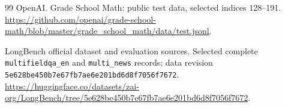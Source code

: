 \documentclass[10pt,a4paper]{article}
\begin{document}
\begin{thebibliography}{99}
OpenAI.
\newblock Grade School Math: public test data, selected indices 128--191.
\url{https://github.com/openai/grade-school-math/blob/master/grade_school_math/data/test.jsonl}.

LongBench official dataset and evaluation sources.
\newblock Selected complete \texttt{multifieldqa\_en} and \texttt{multi\_news}
records; data revision \texttt{5e628be450b7e67fb7ae6e201bd6d8f7056f7672}.
\url{https://huggingface.co/datasets/zai-org/LongBench/tree/5e628be450b7e67fb7ae6e201bd6d8f7056f7672}.
\end{thebibliography}
\end{document}
